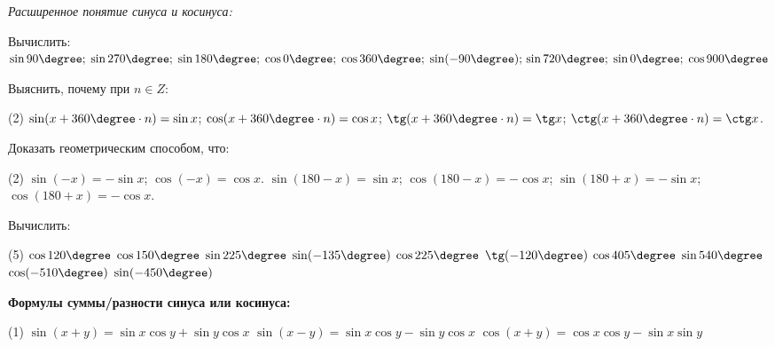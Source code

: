 \begin{class}[number=7]
	\begin{listofex}
		\item \textit{Расширенное понятие синуса и косинуса:}\\[0.5em]
	\item Вычислить: \quad \( \sin90\degree;\;\sin270\degree;\;\sin180\degree;\;\cos0\degree;\;\cos360\degree;\;\sin(-90\degree);\\
	\sin720\degree;\;\sin0\degree;\;\cos900\degree \)
	\item Выяснить, почему при \( n\in Z \):
	\begin{tasks}(2)
		\task \( \sin(x+360\degree\cdot n) = \sin x \);
		\task \( \cos(x+360\degree\cdot n) = \cos x \);
		\task \( \tg(x+360\degree\cdot n) = \tg x \);
		\task \( \ctg(x+360\degree\cdot n) = \ctg x \).
	\end{tasks}
	\item Доказать геометрическим способом, что:
	\begin{tasks}(2)
		\task \( \sin(-x) = -\sin x \);
		\task \( \cos(-x) = \cos x \).
		\task \( \sin(180 - x) = \sin x \);
		\task \( \cos(180 - x) = -\cos x \);
		\task \( \sin(180+x) = -\sin x \);
		\task \( \cos(180+x) = -\cos x \).
	\end{tasks}
	\item Вычислить:
	\begin{tasks}(5)
		\task \( \cos120\degree \)
		\task \( \cos150\degree \)
		\task \( \sin225\degree \)
		\task \( \sin(-135\degree )\)
		\task \( \cos225\degree \)
		\task \( \tg(-120\degree) \)
		\task \( \cos405\degree \)
		\task \( \sin540\degree \)
		\task \( \cos(-510\degree) \)
		\task \( \sin(-450\degree) \)
	\end{tasks}
		\item \textbf{Формулы суммы/разности синуса или косинуса:}
		\begin{tasks}(1)
			\task \( \sin(x+y)=\sin x\cos y + \sin y \cos x \)
			\task \( \sin(x-y)=\sin x\cos y - \sin y \cos x \)
			\task \( \cos(x+y)=\cos x \cos y - \sin x \sin y \)

\end{tasks}
\end{listofex}
\end{class}
